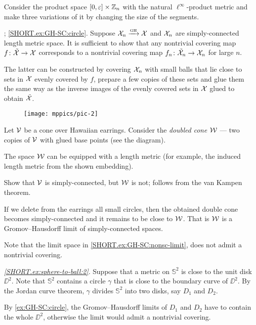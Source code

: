 Consider the product space $[0,\varepsilon]\times \mathbb{Z}_n$ with the natural $\ell^\infty$-product metric and make three variations of it by changing the size of the segments.

\parbf{\ref{ex:GH-SC}}; \ref{SHORT.ex:GH-SC:circle}.
Suppose $\mathcal{X}_n\xrightarrow{\mbox{\tiny\rm GH}} \mathcal{X}$ and $\mathcal{X}_n$ are simply-connected length metric space.
It is sufficient to show that any nontrivial covering map $f\colon\tilde{\mathcal{X}}\to \mathcal{X}$ corresponds to a nontrivial covering map $f_n\colon\tilde{\mathcal{X}}_n\to \mathcal{X}_n$ for large $n$.

The latter can be constructed by covering $\mathcal{X}_n$ with small balls that lie close to sets in $\mathcal{X}$ evenly covered by $f$, prepare a few copies of these sets and glue them the same way as the inverse images of the evenly covered sets in $\mathcal{X}$ glued to obtain $\tilde{\mathcal{X}}$.

\begin{wrapfigure}{r}{42 mm}
\vskip-4mm
\centering
\texttt{[image: mppics/pic-2]}
\end{wrapfigure}

Let $\mathcal{V}$ be a cone over Hawaiian earrings.
Consider the {}\emph{doubled cone} $\mathcal{W}$ --- two copies of $\mathcal{V}$ with glued base points (see the diagram).

The space $\mathcal{W}$ can be equipped with a length metric
(for example, the induced length metric from the shown embedding).

Show that $\mathcal{V}$ is simply-connected, but $\mathcal{W}$ is not; follows from the van Kampen theorem.

If we delete from the earrings all small circles, then the obtained double cone becomes simply-connected and it remains to be close to $\mathcal{W}$.
That is $\mathcal{W}$ is a Gromov--Hausdorff limit of simply-connected spaces.

Note that the limit space in \ref{SHORT.ex:GH-SC:nonsc-limit}, does not admit a nontrivial covering.

\parbf{\ref{ex:sphere-to-ball},}
\textit{\ref{SHORT.ex:sphere-to-ball:2}.}
Suppose that a metric on $\mathbb{S}^2$ is close to the unit disk $\DD^2$.
Note that $\mathbb{S}^2$ contains a circle $\gamma$ that is close to the boundary curve of $\DD^2$.
By the Jordan curve theorem, $\gamma$ divides $\mathbb{S}^2$ into two disks, say $D_1$ and $D_2$.

By \ref{ex:GH-SC:circle}, the Gromov--Hausdorff limits of $D_1$ and $D_2$ have to contain the whole $\DD^2$, otherwise the limit would admit a nontrivial covering.

